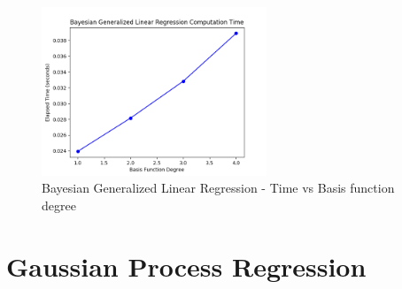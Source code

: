 \documentclass[parskip=full]{scrartcl}
\begin{document}
        \begin{figure}[ht]
            \centering
            \includegraphics[width=0.6\textwidth]{3b_degree_vs_time.png}
            \caption{Bayesian Generalized Linear Regression - Time vs Basis function degree}
            \label{fig:bglg_time_v_deg}
        \end{figure}
    

    \section{Gaussian Process Regression} %
    \label{sec:gaussian_process_regression}
    

\end{document}
